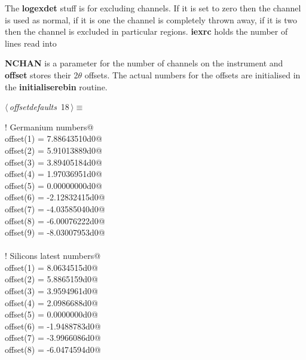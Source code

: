 \documentclass[10pt,a4paper,notitlepage]{article}
\newcommand{\var}[1]{\textbf{\textsf{#1}}} %
\newcommand{\code}[1]{\textbf{\textsf{#1}}} %
\begin{document}
The \var{logexdet} stuff is for excluding channels. If it is set to zero then
the channel is used as normal, if it is one the channel is completely thrown
away, if it is two then the channel is excluded in particular regions.
\var{iexrc} holds the number of lines read into

\var{NCHAN} is a parameter for the number of channels on the
instrument and \var{offset} stores their 2$\theta$ offsets. 
The actual numbers for the offsets 
are initialised in the \code{initialiserebin} routine.
\begin{flushleft} \small
\begin{minipage}{\linewidth}\label{scrap21}\raggedright\small
{} $\langle\,${\it offsetdefaults}\nobreak\ {\footnotesize {18}}$\,\rangle\equiv$
\vspace{-1ex}
\begin{list}{}{} \item
\mbox{}\verb@ ! Germanium numbers@\\
\mbox{}\verb@      offset(1) =  7.88643510d0@\\
\mbox{}\verb@      offset(2) =  5.91013889d0@\\
\mbox{}\verb@      offset(3) =  3.89405184d0@\\
\mbox{}\verb@      offset(4) =  1.97036951d0@\\
\mbox{}\verb@      offset(5) =  0.00000000d0@\\
\mbox{}\verb@      offset(6) = -2.12832415d0@\\
\mbox{}\verb@      offset(7) = -4.03585040d0@\\
\mbox{}\verb@      offset(8) = -6.00076222d0@\\
\mbox{}\verb@      offset(9) = -8.03007953d0@\\
\mbox{}\verb@@\\
\mbox{}\verb@ ! Silicons latest numbers@\\
\mbox{}\verb@      offset(1) = 8.0634515d0@\\
\mbox{}\verb@      offset(2) = 5.8865159d0@\\
\mbox{}\verb@      offset(3) = 3.9594961d0@\\
\mbox{}\verb@      offset(4) = 2.0986688d0@\\
\mbox{}\verb@      offset(5) = 0.0000000d0@\\
\mbox{}\verb@      offset(6) = -1.9488783d0@\\
\mbox{}\verb@      offset(7) = -3.9966086d0@\\
\mbox{}\verb@      offset(8) = -6.0474594d0@\\

\end{list}
\end{minipage}
\end{flushleft}
\end{document}

